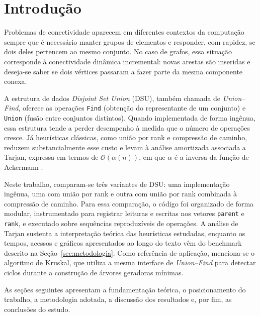 \section{Introdução}
\label{sec:introducao}

Problemas de conectividade aparecem em diferentes contextos da computação sempre que é necessário manter grupos de elementos e responder, com rapidez, se dois deles pertencem ao mesmo conjunto. No caso de grafos, essa situação corresponde à conectividade dinâmica incremental: novas arestas são inseridas e deseja-se saber se dois vértices passaram a fazer parte da mesma componente conexa.

A estrutura de dados \emph{Disjoint Set Union} (DSU), também chamada de \emph{Union--Find}, oferece as operações \texttt{Find} (obtenção do representante de um conjunto) e \texttt{Union} (fusão entre conjuntos distintos). Quando implementada de forma ingênua, essa estrutura tende a perder desempenho à medida que o número de operações cresce. Já heurísticas clássicas, como união por rank e compressão de caminho, reduzem substancialmente esse custo e levam à análise amortizada associada a Tarjan, expressa em termos de $\mathcal{O}(\alpha(n))$, em que $\alpha$ é a inversa da função de Ackermann \cite{tarjan1975efficiency}.

Neste trabalho, comparam-se três variantes de DSU: uma implementação ingênua, uma com união por rank e outra com união por rank combinada à compressão de caminho. Para essa comparação, o código foi organizado de forma modular, instrumentado para registrar leituras e escritas nos vetores \texttt{parent} e \texttt{rank}, e executado sobre sequências reproduzíveis de operações. A análise de Tarjan \cite{tarjan1975efficiency} sustenta a interpretação teórica das heurísticas estudadas, enquanto os tempos, acessos e gráficos apresentados ao longo do texto vêm do benchmark descrito na Seção~\ref{sec:metodologia}. Como referência de aplicação, menciona-se o algoritmo de Kruskal, que utiliza a mesma interface de \emph{Union--Find} para detectar ciclos durante a construção de árvores geradoras mínimas.

As seções seguintes apresentam a fundamentação teórica, o posicionamento do trabalho, a metodologia adotada, a discussão dos resultados e, por fim, as conclusões do estudo.
